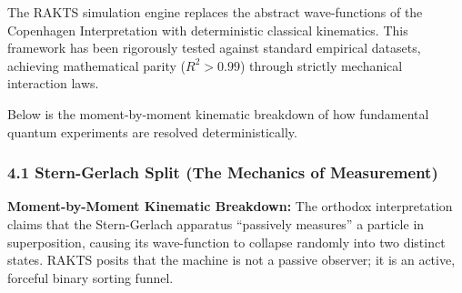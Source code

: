 \documentclass[twocolumn]{article}
\begin{document}
The RAKTS simulation engine replaces the abstract wave-functions of the
Copenhagen Interpretation with deterministic classical kinematics. This
framework has been rigorously tested against standard empirical
datasets, achieving mathematical parity (\(R^2 > 0.99\)) through
strictly mechanical interaction laws.

Below is the moment-by-moment kinematic breakdown of how fundamental
quantum experiments are resolved deterministically.

\subsubsection{4.1 Stern-Gerlach Split (The Mechanics of
Measurement)}\label{stern-gerlach-split-the-mechanics-of-measurement}

\textbf{Moment-by-Moment Kinematic Breakdown:} The orthodox
interpretation claims that the Stern-Gerlach apparatus ``passively
measures'' a particle in superposition, causing its wave-function to
collapse randomly into two distinct states. RAKTS posits that the
machine is not a passive observer; it is an active, forceful binary
sorting funnel.
\end{document}

